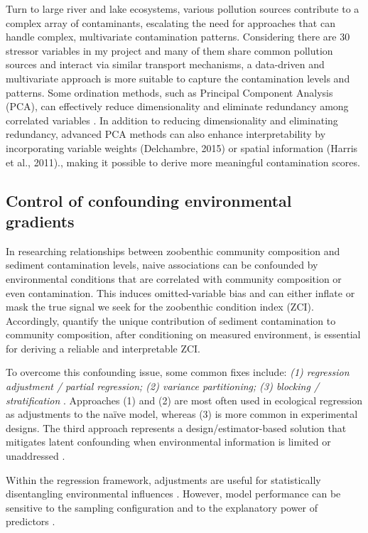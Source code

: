 Turn to large river and lake ecosystems, various pollution sources contribute to a complex array of contaminants,
escalating the need for approaches that can handle complex, multivariate contamination patterns.
Considering there are 30 stressor variables in my project and many of them share 
common pollution sources and interact via similar transport mechanisms,
a data-driven and multivariate approach is more suitable to capture the contamination levels and patterns.
Some ordination methods, such as Principal Component Analysis (PCA), can effectively reduce dimensionality and 
eliminate redundancy among correlated variables \cite{Zitko1994PCA}.
In addition to reducing dimensionality and eliminating redundancy,
advanced PCA methods can also enhance interpretability by incorporating variable weights \cite{Delchambre2015} (Delchambre, 2015) or spatial information \cite{Harris2011GWPCA} (Harris et al., 2011).,
making it possible to derive more meaningful contamination scores.



\subsection{Control of confounding environmental gradients}
In researching relationships between zoobenthic community composition and 
sediment contamination levels, naive associations can be confounded by environmental conditions
that are correlated with community composition or even contamination.
This induces omitted-variable bias and can either inflate or mask the true signal we seek 
for the zoobenthic condition index (ZCI). Accordingly, quantify the unique contribution of 
sediment contamination to community composition, after conditioning on measured environment,
is essential for deriving a reliable and interpretable ZCI.

To overcome this confounding issue, some common fixes include: \textit{(1) regression adjustment / partial regression; (2) variance partitioning; (3) blocking / stratification} \cite{Eberhardt1991FieldStudies, Wiens1995AccidentalImpacts}.
Approaches (1) and (2) are most often used in ecological regression as adjustments to the naïve model, whereas (3) is more common in experimental designs.
The third approach represents a design/estimator-based solution that mitigates latent confounding when environmental information is limited or unaddressed \cite{Byrnes2025CausalInference}.

Within the regression framework, adjustments are useful for statistically disentangling environmental influences \cite{Legendre2008VariationPartitioning}.
However, model performance can be sensitive to the sampling configuration and to the explanatory power of predictors \cite{Legendre2010Limitations,Fischer2018Uncertainty}.

